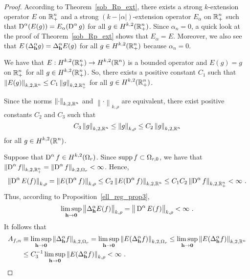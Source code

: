\begin{proof}
According to Theorem~\ref{sob_Rp_ext}, there exists a strong
$k$-extension operator $E$ on $\displaystyle \mathbb{R}^n_+ $ and a strong
$(k-|\alpha|)$-extension operator $E_\alpha$ on
$\displaystyle \mathbb{R}^n_+$ such that
$\displaystyle \operatorname{D}^\alpha (E(g)) = E_\alpha(\operatorname{D}^\alpha g)$
for all $\displaystyle g \in H^{k,2}(\mathbb{R}^n_+)$.
Since $\alpha_n=0$, a quick look at the proof of
Theorem~\ref{sob_Rp_ext} shows that $E_\alpha = E$.
Moreover, we also see that 
$\displaystyle E\left( \Delta^\alpha_{\mathbf{h}} g\right) =
\Delta^\alpha_{\mathbf{h}} E(g)$
for all $\displaystyle g \in H^{k,2}(\mathbb{R}^n_+)$ because $\alpha_n=0$.

We have that $\displaystyle E:H^{k,2}(\mathbb{R}^n_+) \to H^{k,2}(\mathbb{R}^n)$ is a
bounded operator and $E(g) = g$ on $\displaystyle \mathbb{R}^n_+$ for all
$\displaystyle g \in H^{k,2}(\mathbb{R}^n_+)$.  So, there exists a
positive constant $C_1$ such that
$\displaystyle \left\| E(g) \right\|_{k,2,\mathbb{R}^n} \leq C_1
\left\| g \right\|_{k,2,\mathbb{R}^n_+}$ for all $\displaystyle g \in H^{k,2}(\mathbb{R}^n_+)$.

Since the norms $\displaystyle \left\|\cdot\right\|_{k,2,\mathbb{R}^n}$ and 
$\displaystyle \left\|\cdot\right\|_{k,\rho}$ are equivalent, there
exist positive constants $C_2$ and $C_3$ such that
\[
C_3 \left\|g \right\|_{k,2,\mathbb{R}^n} \leq \left\|g \right\|_{k,\rho}
\leq C_2 \left\|g \right\|_{k,2,\mathbb{R}^n}
\]
for all $\displaystyle g \in H^{k,2}(\mathbb{R}^n)$.

 Suppose that $\displaystyle \operatorname{D}^\alpha f \in H^{k,2}(\Omega_r)$.
Since $\operatorname{supp} f \subset \Omega_{r,0}$, we have that\\
$\displaystyle \left\|\operatorname{D}^\alpha f\right\|_{k,2,\mathbb{R}^n_+}
= \displaystyle \left\|\operatorname{D}^\alpha f \right\|_{k,2,\Omega_r} < \infty$.
Hence,
\[
\left\| \operatorname{D}^\alpha E(f) \right\|_{k,\rho} 
= \left\| E(\operatorname{D}^\alpha f)\right\|_{k,\rho}
\leq C_2 \left\| E(\operatorname{D}^\alpha f)\right\|_{k,2,\mathbb{R}^n} \leq C_1 C_2
\left\| \operatorname{D}^\alpha f\right\|_{k,2,\mathbb{R}^n_+} < \infty \ .
\]
Thus, according to Proposition~\ref{ell_reg_prop3},
\[
\limsup_{\VEC{h}\rightarrow \VEC{0}} \big\|\Delta^\alpha_{\VEC{h}} E(f)
\big\|_{k,\rho} = \big\|\diff^\alpha E(f)\big\|_{k,\rho} < \infty \ .
\]
It follows that
\begin{align*}
A_{f,\alpha} &\equiv \limsup_{\mathbf{h}\rightarrow \mathbf{0}}
\left\|\Delta^\alpha_{\mathbf{h}} f\right\|_{k,2,\Omega_r}
= \limsup_{\mathbf{h}\rightarrow \mathbf{0}}
\left\| E(\Delta^\alpha_{\mathbf{h}} f)\right \|_{k,2,\Omega_r}
\leq \limsup_{\mathbf{h}\rightarrow \mathbf{0}}
\left\| E(\Delta^\alpha_{\mathbf{h}} f)\right \|_{k,2,\mathbb{R}^n} \\
&\leq C_3^{-1} \limsup_{\mathbf{h}\rightarrow \mathbf{0}}
\left\| E(\Delta^\alpha_{\mathbf{h}} f)\right \|_{k,\rho}
< \infty \ .
\end{align*}


\end{proof}
